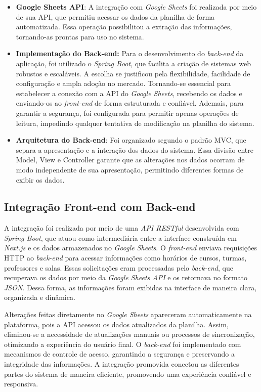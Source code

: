 \begin{itemize}
    \item \textbf{Google Sheets API}: A integração com \textit{Google Sheets} foi realizada por meio de sua API, que permitiu acessar os dados da planilha de forma automatizada. Essa operação possibilitou a extração das informações, tornando-as prontas para uso no sistema.
    \item \textbf{Implementação do Back-end:} Para o desenvolvimento do \textit{back-end} da aplicação, foi utilizado o \textit{Spring Boot}, que facilita a criação de sistemas web robustos e escaláveis. A escolha se justificou pela flexibilidade, facilidade de configuração e ampla adoção no mercado. Tornando-se essencial para estabelecer a conexão com a API do \textit{Google Sheets}, recebendo os dados e enviando-os ao \textit{front-end} de forma estruturada e confiável. Ademais, para garantir a segurança, foi configurada para permitir apenas operações de leitura, impedindo qualquer tentativa de modificação na planilha do sistema.
    \item \textbf{Arquitetura do Back-end}: Foi organizado segundo o padrão MVC, que separa a apresentação e a interação dos dados do sistema. Essa divisão entre Model, View e Controller garante que as alterações nos dados ocorram de modo independente de sua apresentação, permitindo diferentes formas de exibir os dados.
\end{itemize}

\subsection{Integração Front-end com Back-end}

A integração foi realizada por meio de uma \textit{API RESTful} desenvolvida com \textit{Spring Boot}, que atuou como intermediária entre a interface construída em \textit{Next.js} e os dados armazenados no \textit{Google Sheets}. O \textit{front-end} enviava requisições HTTP ao \textit{back-end} para acessar informações como horários de cursos, turmas, professores e salas. Essas solicitações eram processadas pelo \textit{back-end}, que recuperava os dados por meio da \textit{Google Sheets API} e os retornava no formato \textit{JSON}. Dessa forma, as informações foram exibidas na interface de maneira clara, organizada e dinâmica.

Alterações feitas diretamente no \textit{Google Sheets} apareceram automaticamente na plataforma, pois a API acessou os dados atualizados da planilha. Assim, eliminou-se a necessidade de atualizações manuais ou processos de sincronização, otimizando a experiência do usuário final. O \textit{back-end} foi implementado com mecanismos de controle de acesso, garantindo a segurança e preservando a integridade das informações. A integração promovida conectou as diferentes partes do sistema de maneira eficiente, promovendo uma experiência confiável e responsiva.


